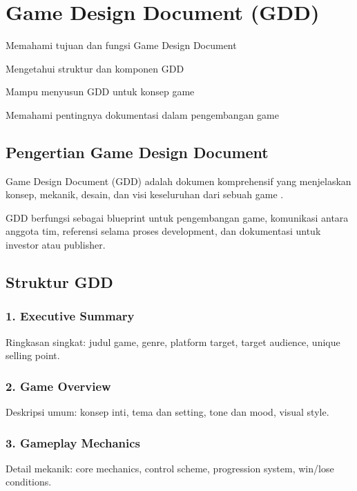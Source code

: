 \section{Game Design Document (GDD)}

\begin{learningoutcomes}
\item Memahami tujuan dan fungsi Game Design Document
\item Mengetahui struktur dan komponen GDD
\item Mampu menyusun GDD untuk konsep game
\item Memahami pentingnya dokumentasi dalam pengembangan game
\end{learningoutcomes}

\subsection{Pengertian Game Design Document}

\begin{definisi}
Game Design Document (GDD) adalah dokumen komprehensif yang menjelaskan konsep, mekanik, desain, dan visi keseluruhan dari sebuah game \cite{Schell2019}.
\end{definisi}

GDD berfungsi sebagai blueprint untuk pengembangan game, komunikasi antara anggota tim, referensi selama proses development, dan dokumentasi untuk investor atau publisher.

\subsection{Struktur GDD}

\subsubsection{1. Executive Summary}
Ringkasan singkat: judul game, genre, platform target, target audience, unique selling point.

\subsubsection{2. Game Overview}
Deskripsi umum: konsep inti, tema dan setting, tone dan mood, visual style.

\subsubsection{3. Gameplay Mechanics}
Detail mekanik: core mechanics, control scheme, progression system, win/lose conditions.

